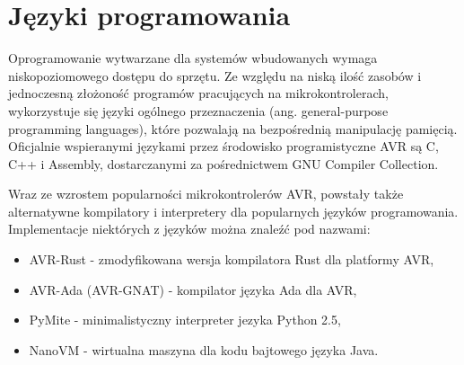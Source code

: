 \section{Języki programowania}
Oprogramowanie wytwarzane dla systemów wbudowanych wymaga niskopoziomowego dostępu do sprzętu. Ze względu na niską ilość zasobów i jednoczesną złożoność programów pracujących na mikrokontrolerach, wykorzystuje się języki ogólnego przeznaczenia (ang. general-purpose programming languages), które pozwalają na bezpośrednią manipulację pamięcią. Oficjalnie wspieranymi językami przez środowisko programistyczne AVR są C, C++ i Assembly, dostarczanymi za pośrednictwem GNU Compiler Collection.

Wraz ze wzrostem popularności mikrokontrolerów AVR, powstały także alternatywne kompilatory i interpretery dla popularnych języków programowania. Implementacje niektórych z języków można znaleźć pod nazwami:
\begin{itemize}
\item AVR-Rust - zmodyfikowana wersja kompilatora Rust dla platformy AVR,
\item AVR-Ada (AVR-GNAT) - kompilator języka Ada dla AVR,
\item PyMite - minimalistyczny interpreter jezyka Python 2.5,
\item NanoVM - wirtualna maszyna dla kodu bajtowego języka Java.
\end{itemize}

%
%
%




